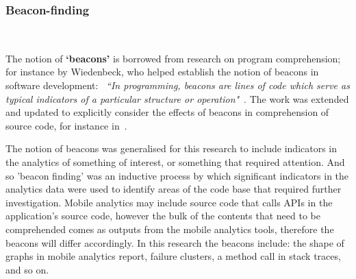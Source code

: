 


\subsubsection{Beacon-finding}~\label{section-beacon-finding-method} %

The notion of \textbf{`beacons'} is borrowed from research on program comprehension; for instance by Wiedenbeck, who helped establish the notion of beacons in software development: ~\emph{``In programming, beacons are lines of code which serve as typical indicators of a particular structure or operation"}~\citep[p.679]{WIEDENBECK1986_beacons_in_computer_program_comprehension}. The work was extended and updated to explicitly consider the effects of beacons in comprehension of source code, for instance in~\citealt{crosby2002_roles_beacons_play_in_comprehension_etc}.

The notion of beacons was generalised for this research to include indicators in the analytics of something of interest, or something that required attention.  And so 'beacon finding' was an inductive process by which significant indicators in the analytics data were used to identify areas of the code base that required further investigation.  Mobile analytics may include source code that calls APIs in the application's source code, however the bulk of the contents that need to be comprehended comes as outputs from the mobile analytics tools, therefore the beacons will differ accordingly. In this research the beacons include: the shape of graphs in mobile analytics report, failure clusters, a method call in stack traces, and so on.

